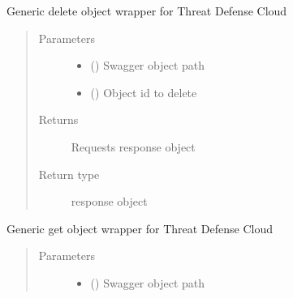 \documentclass[letterpaper,10pt,english]{sphinxmanual}
\begin{document}
\begin{fulllineitems}
\begin{fulllineitems}
\label{\detokenize{b1tdc-class:bloxone.b1tdc.delete}}
\sphinxAtStartPar
Generic delete object wrapper for Threat Defense Cloud
\begin{quote}\begin{description}
\item[{Parameters}] \leavevmode\begin{itemize}
\item {} 
\sphinxAtStartPar
{} () \textendash{} Swagger object path

\item {} 
\sphinxAtStartPar
{} () \textendash{} Object id to delete

\end{itemize}

\item[{Returns}] \leavevmode
\sphinxAtStartPar
Requests response object

\item[{Return type}] \leavevmode
\sphinxAtStartPar
response object

\end{description}\end{quote}

\end{fulllineitems}


\begin{fulllineitems}
\label{\detokenize{b1tdc-class:bloxone.b1tdc.get}}
\sphinxAtStartPar
Generic get object wrapper for Threat Defense Cloud
\begin{quote}\begin{description}
\item[{Parameters}] \leavevmode\begin{itemize}
\item {} 
\sphinxAtStartPar
{} () \textendash{} Swagger object path


\end{itemize}
\end{description}
\end{quote}
\end{fulllineitems}
\end{fulllineitems}
\end{document}
